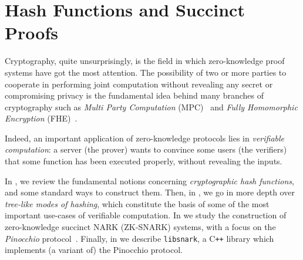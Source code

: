 \chapter{Hash Functions and Succinct Proofs}\label{chap:crypto}
Cryptography, quite unsurprisingly, is the field in which zero-knowledge proof systems have 
got the most attention.
The possibility of two or more parties to cooperate in performing joint computation without 
revealing any secret or compromising privacy is the fundamental idea behind many branches of 
cryptography such as \emph{Multi Party Computation} (MPC)~\cite{Yao1982-2} and 
\emph{Fully Homomorphic Encryption} (FHE)~\cite{ArmknechtEtAl2015}.

Indeed, an important application of zero-knowledge protocols lies in \emph{verifiable computation}:
a server (the prover) wants to convince some users (the verifiers) that some function has been 
executed properly, without revealing the inputs.

In , we review the fundamental notions concerning 
\emph{cryptographic hash functions}, and some standard ways to construct them.
Then, in , we go in more depth over \emph{tree-like modes of hashing}, which 
constitute the basis of some of the most important use-cases of verifiable computation.
In  we study the construction of zero-knowledge succinct NARK (ZK-SNARK) systems, 
with a focus on the \emph{Pinocchio} protocol~\cite{ParnoGHR2013}.
Finally, in  we describe \texttt{libsnark}, a C\texttt{++} library which 
implements (a variant of) the Pinocchio protocol. 





